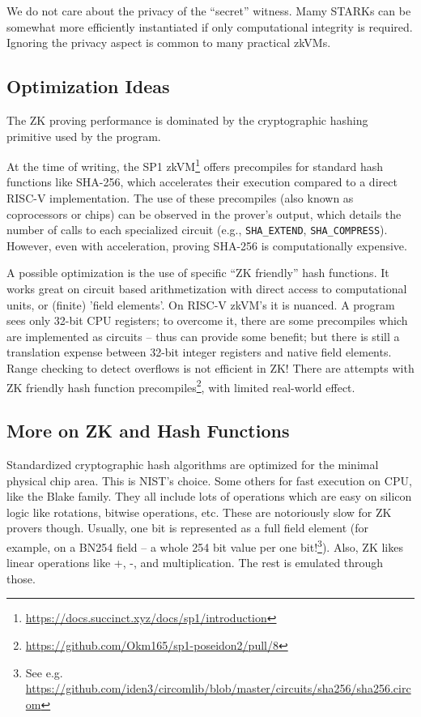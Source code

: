 \documentclass[twocolumn]{article}
\begin{document}
We do not care about the privacy of the ``secret'' witness. Mamy STARKs can be somewhat more efficiently instantiated if only computational integrity is required. Ignoring the privacy aspect is common to many practical zkVMs.


\subsection{Optimization Ideas}

The ZK proving performance is dominated by the cryptographic hashing primitive used by the program.

At the time of writing, the SP1 zkVM\footnote{\url{https://docs.succinct.xyz/docs/sp1/introduction}} offers precompiles for standard hash functions like SHA-256, which accelerates their execution compared to a direct RISC-V implementation. The use of these precompiles (also known as coprocessors or chips) can be observed in the prover's output, which details the number of calls to each specialized circuit (e.g., \lstinline|SHA_EXTEND|, \lstinline|SHA_COMPRESS|). However, even with acceleration, proving SHA-256 is computationally expensive.

A possible optimization is the use of specific ``ZK friendly'' hash functions. It works great on circuit based arithmetization with direct access to computational units, or (finite) 'field elements'. On RISC-V zkVM's it is nuanced. A program sees only 32-bit CPU registers; to overcome it, there are some precompiles which are implemented as circuits -- thus can provide some benefit; but there is still a translation expense between 32-bit integer registers and native field elements. Range checking to detect overflows is not efficient in ZK! There are attempts with ZK friendly hash function precompiles\footnote{\url{https://github.com/Okm165/sp1-poseidon2/pull/8}}, with limited real-world effect.


\subsection{More on ZK and Hash Functions}

Standardized cryptographic hash algorithms are optimized for the minimal physical chip area. This is NIST's choice. Some others for fast execution on CPU, like the Blake family. They all include lots of operations which are easy on silicon logic like rotations, bitwise operations, etc. These are notoriously slow for ZK provers though. Usually, one bit is represented as a full field element (for example, on a BN254 field -- a whole 254 bit value per one bit!\footnote{See e.g. \url{https://github.com/iden3/circomlib/blob/master/circuits/sha256/sha256.circom}}). Also, ZK likes linear operations like +, -, and multiplication. The rest is emulated through those.
\end{document}
